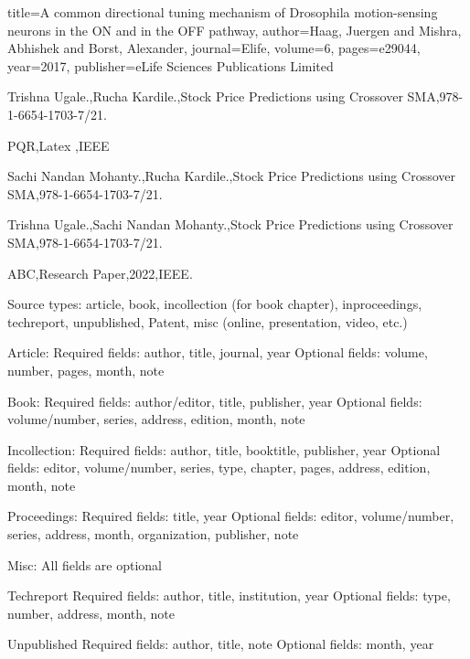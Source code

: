 \documentclass[12pt]{article}
\begin{document}
\begin{thebibliography} {}

  title={A common directional tuning mechanism of Drosophila motion-sensing neurons in the ON and in the OFF pathway},
  author={Haag, Juergen and Mishra, Abhishek and Borst, Alexander},
  journal={Elife},
  volume={6},
  pages={e29044},
  year={2017},
  publisher={eLife Sciences Publications Limited}

 Trishna Ugale.,Rucha Kardile.,Stock Price Predictions using Crossover SMA,978-1-6654-1703-7/21.

 PQR,Latex ,IEEE

 Sachi Nandan Mohanty.,Rucha Kardile.,Stock Price Predictions using Crossover SMA,978-1-6654-1703-7/21.

 Trishna Ugale.,Sachi Nandan Mohanty.,Stock Price Predictions using Crossover SMA,978-1-6654-1703-7/21.

 ABC,Research Paper,2022,IEEE.

\bibitem Source types:
article, book, incollection (for book chapter), inproceedings, techreport, unpublished, Patent, misc (online, presentation, video, etc.)


\bibitem Article:
Required fields: author, title, journal, year
Optional fields: volume, number, pages, month, note

\bibitem Book:
Required fields: author/editor, title, publisher, year
Optional fields: volume/number, series, address, edition, month, note

\bibitem Incollection:
Required fields: author, title, booktitle, publisher, year
Optional fields: editor, volume/number, series, type, chapter, pages, address, edition, month, note

\bibitem Proceedings: 
Required fields: title, year
Optional fields: editor, volume/number, series, address, month, organization, publisher, note

\bibitem Misc: 
All fields are optional

\bibitem Techreport 
Required fields: author, title, institution, year
Optional fields: type, number, address, month, note

\bibitem Unpublished 
Required fields: author, title, note
Optional fields: month, year

\end{thebibliography} 
\end{document}
